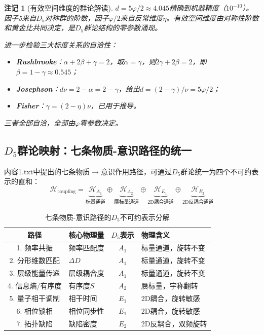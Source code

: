 \documentclass[12pt,a4paper,twocolumn]{article}
\renewcommand{\phi}{\varphi}
\newtheorem{remark}[theorem]{注记}
\begin{document}
\begin{remark}[有效空间维度的群论解读]
$d = 5\phi/2 \approx 4.045$精确到机器精度（$10^{-10}$）。因子5来自$D_5$对称群的阶数，因子$\phi/2$来自反常维度$\eta$。有效空间维度由对称性阶数和黄金比共同决定，是$D_5$群论结构的零参数涌现。

进一步检验三大标度关系的自洽性：
\begin{itemize}
\item \textbf{Rushbrooke}：$\alpha + 2\beta + \gamma = 2$，取$\alpha = \gamma$，则$2\gamma + 2\beta = 2$，即$\beta = 1 - \gamma \approx 0.545$；
\item \textbf{Josephson}：$d\nu = 2-\alpha = 2-\gamma$，给出$d = (2-\gamma)/\nu = 5\phi/2$；
\item \textbf{Fisher}：$\gamma = (2-\eta)\nu$，已用于推导。
\end{itemize}
三者全部自洽，全部由$\phi$零参数决定。
\end{remark}

\subsection{$D_5$群论映射：七条物质-意识路径的统一}
\label{subsec:seven_paths}

内容1.txt中提出的七条物质$\to$意识作用路径，可通过$D_5$群论统一为四个不可约表示的直和：
\begin{equation}
\mathcal{H}_{\text{coupling}} = \underbrace{\mathcal{H}_{A_1}}_{\text{标量通道}} \oplus \underbrace{\mathcal{H}_{A_2}}_{\text{赝标量通道}} \oplus \underbrace{\mathcal{H}_{E_1}}_{\text{2D耦合通道}} \oplus \underbrace{\mathcal{H}_{E_2}}_{\text{2D反耦合通道}}
\end{equation}

\begin{table}[H]
\centering
\caption{七条物质-意识路径的$D_5$不可约表示分解}
\begin{tabular}{c|l|c|l}
\hline
\textbf{路径} & \textbf{核心物理量} & \textbf{$D_5$表示} & \textbf{物理含义} \\
\hline
1. 频率共振 & 频率匹配度 & $A_1$ & 标量通道，旋转不变 \\
2. 分形维数匹配 & $\Delta D$ & $A_1$ & 标量通道，旋转不变 \\
3. 层级能量传递 & 层级耦合度 & $A_1$ & 标量通道，旋转不变 \\
4. 信息熵/有序度 & 有序度$S$ & $A_2$ & 赝标量，宇称翻转 \\
5. 量子相干调制 & 相干时间 & $E_1$ & 2D耦合，旋转敏感 \\
6. 相位锁相 & 相位同步性 & $E_1$ & 2D耦合，旋转敏感 \\
7. 拓扑缺陷 & 缺陷密度 & $E_2$ & 2D反耦合，双频旋转 \\
\hline
\end{tabular}
\end{table}
\end{document}
